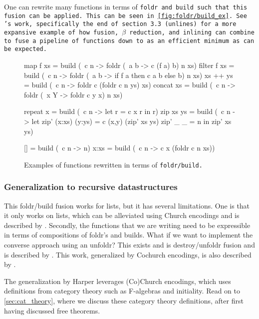 One can rewrite many functions in terms of \tt{foldr} and \tt{build} such that this fusion can be applied. This can be seen in \autoref{fig:foldr/build_ex}.
See \cite{Gill1993}'s work, specifically the end of section 3.3 (\tt{unlines}) for a more expansive example of how fusion, $\beta$ reduction, and inlining can combine to fuse a pipeline of functions down to as an efficient minimum as can be expected.
\begin{figure}[ht]
    \centering
    \begin{code}
map f xs    = build (\ c n -> foldr (\ a b -> c (f a) b) n xs)
filter f xs = build (\ c n -> foldr (\ a b -> if f a then c a b else b) n xs)
xs ++ ys    = build (\ c n -> foldr c (foldr c n ys) xs)
concat xs   = build (\ c n -> foldr (\ x Y -> foldr c y x) n xs)

repeat x    = build (\ c n -> let r = c x r in r)
zip xs ys   = build (\ c n -> let zip' (x:xs) (y:ys) = c (x,y) (zip' xs ys)
                                  zip' _      _      = n
                                  in zip' xs ys)

[]         = build (\ c n -> n)
x:xs       = build (\ c n -> c x (foldr c n xs))
    \end{code}
    \caption{Examples of functions rewritten in terms of \tt{foldr/build}. \citep{Gill1993}}
    \label{fig:foldr/build_ex}
\end{figure}



\subsubsection{Generalization to recursive datastructures}
This foldr/build fusion works for lists, but it has several limitations.
One is that it only works on lists, which can be alleviated using Church encodings and is described by \cite{Harper2011}.
Secondly, the functions that we are writing need to be expressible in terms of compositions of foldr's and builds. What if we want to implement the converse approach using an unfoldr?
This exists and is destroy/unfoldr fusion and is described by \cite{Coutts2007}.
This work, generalized by Cochurch encodings, is also described by \cite{Harper2011}.

The generalization by Harper leverages (Co)Church encodings, which uses definitions from category theory such as F-algebras and initiality.
Read on to \autoref{sec:cat_theory}, where we discuss these category theory definitions, after first having discussed free theorems.

